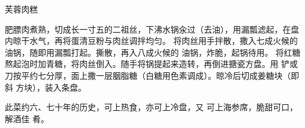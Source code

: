 \begin{recipe}{芙蓉肉糕}

\ingredients


\preparation

\step 肥膘肉煮熟，切成长一寸五的二祖丝，下沸水锅汆过（去油），用漏瓢滤起，在盘
内晾干水气，再将蛋清豆粉与肉丝调拌均匀。
\step 将肉丝用手拌散，撒入七成火候的油锅，随即用漏瓢打起。撕散，再入八成火候的
油锅，炸脆，起锅待用。
\step 将红糖熬起泡时加青糖，将肉丝倒入。随手将锅提起来造转，再倒进搪瓷方盘。用
铲或刀按平约七分厚，面上撒一层胭脂糖（白糖用色素调成）。晾冷后切成姜糖块（即斜
方块），装入条盘。

\features

此菜约六、七十年的历史，可上热食，亦可上冷盘，又 可上海参席，脆甜可口，解酒佳
肴。

\end{recipe}

